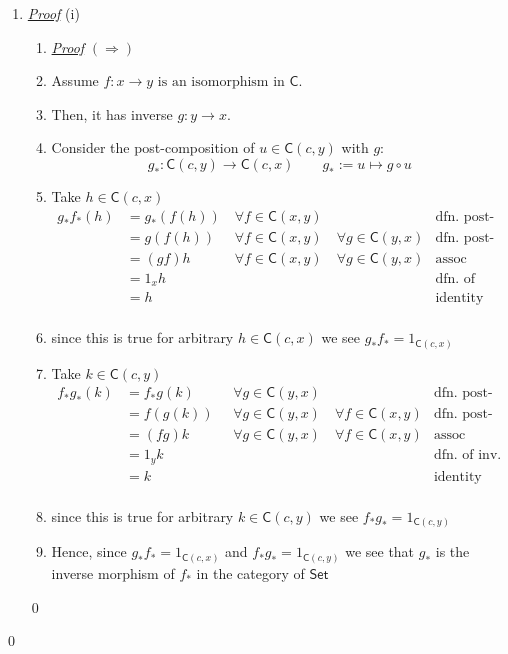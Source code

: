 \documentclass{article}
\theoremstyle{spacious}
\newenvironment{pf}{\begin{enumerate} \item[] \textit{\underline{Proof}} }{\end{enumerate}\qed}
\renewcommand{\:}{\vcentcolon=} %
\begin{document}
\begin{pf}{(i)}
\begin{pf}\(\left(\Rightarrow\right)\)
    \item[] Assume \(f:x\to y \text{ is an isomorphism in }\mathsf{C} \).
    \item[] Then, it has inverse \(g:y \to x\).
    \item[] Consider the post-composition of \(u\in\mathsf{C}\left(c,y\right)\) with $g$:
    \[
        g_*:\mathsf{C} \left(c,y\right) \to \mathsf{C}\left(c,x\right) \qquad g_*:=u\mapsto g\circ u
    \]
\item[] Take \(h \in \mathsf{C}(c,x)\)
\[\begin{aligned}
g_*f_*(h)&=g_*(f(h)) \quad \forall f \in \mathsf{C}\left(x,y\right)\quad &\text{dfn. post-comp.}\\
&=g(f(h)) \quad \phantom{{}_*}\forall f \in \mathsf{C}\left(x,y\right)\quad\forall g \in \mathsf{C}\left(y,x\right)&\text{dfn. post-comp.}\\
&=(gf)h \quad \phantom{{}_*}\phantom{()}\forall f \in \mathsf{C}\left(x,y\right)\quad\forall g \in \mathsf{C}\left(y,x\right)&\text{assoc}\\
&=1_x h \quad \phantom{{}_*}&\text{dfn. of inv. func.}\\
&=h \quad \phantom{{}_*}&\text{identity}\\
\end{aligned}\]
\item[] since this is true for arbitrary \(h\in \mathsf{C}(c,x)\) we see \(g_*f_*=1_{\mathsf{C}\left(c,x\right)}\)
\item[] Take \(k \in \mathsf{C}(c,y)\)
\[\begin{aligned}
f_*g_*(k)&=f_*g(k) \phantom{()}\quad \forall g \in \mathsf{C}\left(y,x\right)\quad &\text{dfn. post-comp.}\\
&=f(g(k)) \quad \phantom{{}_*}\forall g \in \mathsf{C}\left(y,x\right)\quad \forall f \in \mathsf{C}\left(x,y\right)&\text{dfn. post-comp.}\\
&=(fg)k \quad \phantom{{}_*}\phantom{()}\forall g \in \mathsf{C}\left(y,x\right)\quad \forall f \in \mathsf{C}\left(x,y\right)&\text{assoc}\\
&=1_y k \quad \phantom{{}_*}&\text{dfn. of inv. func.}\\
&=k \quad \phantom{{}_*}&\text{identity}\\
\end{aligned}\]
\item[] since this is true for arbitrary \(k\in \mathsf{C}(c,y)\) we see \(f_*g_*=1_{\mathsf{C}\left(c,y\right)}\)
\item[] Hence, since \(g_*f_*=1_{\mathsf{C}\left(c,x\right)}\) and \(f_*g_*=1_{\mathsf{C}\left(c,y\right)}\) we see that \(g_*\) is the inverse morphism of \(f_*\) in the category of \(\mathsf{Set}\)
\end{pf}


\end{pf}
\end{document}
